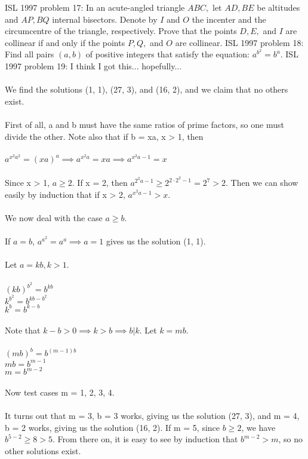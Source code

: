 ISL 1997 problem 17:  In an acute-angled triangle $ ABC,$ let $ AD,BE$ be altitudes and $ AP,BQ$ internal bisectors. Denote by $ I$ and $ O$ the incenter and the circumcentre of the triangle, respectively. Prove that the points $ D, E,$ and $ I$ are collinear if and only if the points $ P, Q,$ and $ O$ are collinear. 
ISL 1997 problem 18:  Find all pairs $ (a,b)$ of positive integers that satisfy the equation: $ a^{b^2} = b^a$. 
ISL 1997 problem 19:  I think I got this... hopefully... \\\\
We find the solutions (1, 1), (27, 3), and (16, 2), and we claim that no others exist. \\\\
First of all, a and b must have the same ratios of prime factors, so one must divide the other.  Note also that if b = xa, x > 1, then \\\\
$a^{x^2a^2} = (xa)^a \implies a^{x^2a} = xa \implies a^{x^2a - 1} = x$ \\\\
Since x > 1, $a \ge 2$.  If x = 2, then $a^{2^2a-1} \ge 2^{2 \cdot 2^2-1} = 2^7 > 2$.  Then we can show easily by induction that if x > 2, $a^{x^2a-1} > x$. \\\\
We now deal with the case $a \ge b$. \\\\
If $a = b$, $a^{a^2} = a^a \implies a = 1$ gives us the solution (1, 1). \\\\
Let $a = kb, k > 1$. \\\\
$(kb)^{b^2} = b^{kb}$ \\
$k^{b^2} = b^{kb-b^2}$ \\
$k^b = b^{k-b}$ \\\\
Note that $k-b > 0 \implies k > b \implies b | k$. Let $k = mb$. \\\\
$(mb)^b = b^{(m-1)b}$ \\
$mb = b^{m-1}$ \\
$m = b^{m-2}$ \\\\
Now test cases m = 1, 2, 3, 4. \\\\
It turns out that m = 3, b = 3 works, giving us the solution (27, 3), and m = 4, b = 2 works, giving us the solution (16, 2).  If m = 5, since $b \ge 2$, we have $b^{5-2} \ge 8 > 5$.  From there on, it is easy to see by induction that $b^{m-2} > m$, so no other solutions exist. 
